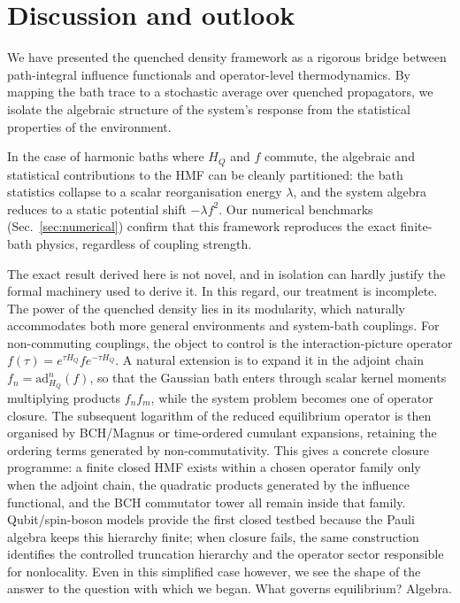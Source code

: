 \section{Discussion and outlook}
\label{sec:discussion}

We have presented the quenched density framework as a rigorous bridge between path-integral influence functionals and operator-level thermodynamics. By mapping the bath trace to a stochastic average over quenched propagators, we isolate the algebraic structure of the system's response from the statistical properties of the environment.

In the case of harmonic baths where $H_Q$ and $f$ commute, the algebraic and statistical contributions to the HMF can be cleanly partitioned: the bath statistics collapse to a scalar reorganisation energy $\lambda$, and the system algebra reduces to a static potential shift $-\lambda f^2$. Our numerical benchmarks (Sec.~\ref{sec:numerical}) confirm that this framework reproduces the exact finite-bath physics, regardless of coupling strength.

The exact result derived here is not novel, and in isolation can hardly justify the formal machinery used to derive it. In this regard, our treatment is incomplete. The power of the quenched density lies in its modularity, which naturally accommodates both more general environments and system-bath couplings. For non-commuting couplings, the object to control is the interaction-picture operator $f(\tau)=e^{\tau H_Q}fe^{-\tau H_Q}$. A natural extension is to expand it in the adjoint chain $f_n=\mathrm{ad}_{H_Q}^n(f)$, so that the Gaussian bath enters through scalar kernel moments multiplying products $f_n f_m$, while the system problem becomes one of operator closure. The subsequent logarithm of the reduced equilibrium operator is then organised by BCH/Magnus or time-ordered cumulant expansions, retaining the ordering terms generated by non-commutativity. This gives a concrete closure programme: a finite closed HMF exists within a chosen operator family only when the adjoint chain, the quadratic products generated by the influence functional, and the BCH commutator tower all remain inside that family. Qubit/spin-boson models provide the first closed testbed because the Pauli algebra keeps this hierarchy finite; when closure fails, the same construction identifies the controlled truncation hierarchy and the operator sector responsible for nonlocality. Even in this simplified case however, we see the shape of the answer to the question with which we began. What governs equilibrium? Algebra.

